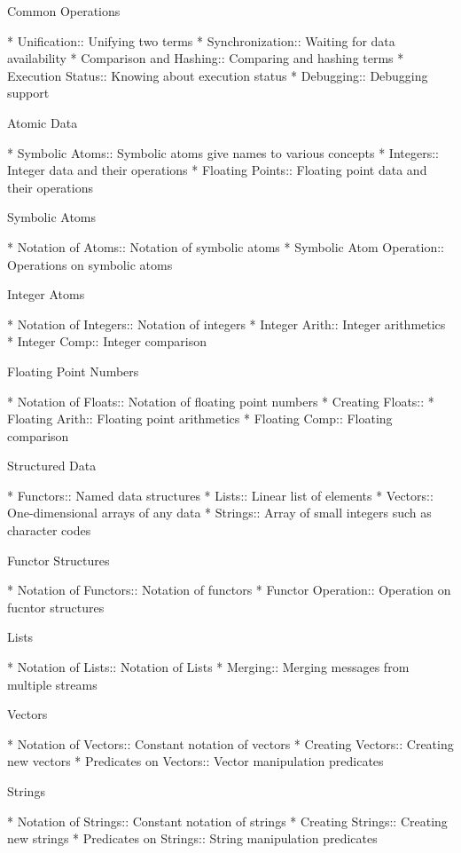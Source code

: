 Common Operations

* Unification::                 Unifying two terms
* Synchronization::             Waiting for data availability
* Comparison and Hashing::      Comparing and hashing terms
* Execution Status::            Knowing about execution status
* Debugging::                   Debugging support

Atomic Data

* Symbolic Atoms::              Symbolic atoms give names to various concepts
* Integers::                    Integer data and their operations
* Floating Points::             Floating point data and their operations

Symbolic Atoms

* Notation of Atoms::           Notation of symbolic atoms
* Symbolic Atom Operation::     Operations on symbolic atoms

Integer Atoms

* Notation of Integers::        Notation of integers
* Integer Arith::               Integer arithmetics
* Integer Comp::                Integer comparison

Floating Point Numbers

* Notation of Floats::          Notation of floating point numbers
* Creating Floats::             
* Floating Arith::              Floating point arithmetics
* Floating Comp::               Floating comparison

Structured Data

* Functors::                    Named data structures
* Lists::                       Linear list of elements
* Vectors::                     One-dimensional arrays of any data
* Strings::                     Array of small integers such as character codes

Functor Structures

* Notation of Functors::        Notation of functors
* Functor Operation::           Operation on fucntor structures

Lists

* Notation of Lists::           Notation of Lists
* Merging::                     Merging messages from multiple streams

Vectors

* Notation of Vectors::         Constant notation of vectors
* Creating Vectors::            Creating new vectors
* Predicates on Vectors::       Vector manipulation predicates

Strings

* Notation of Strings::         Constant notation of strings
* Creating Strings::            Creating new strings
* Predicates on Strings::       String manipulation predicates

